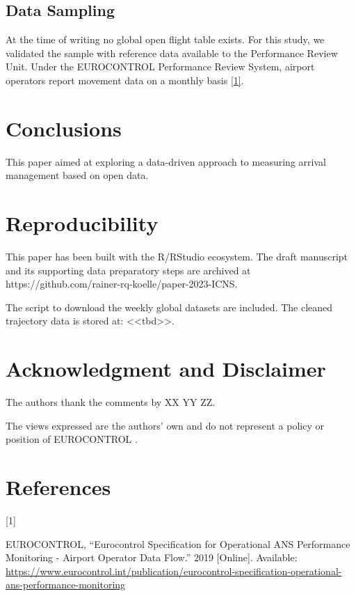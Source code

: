 \documentclass[letterpaper, 10 pt, journal, twoside]{IEEEtran}
\newlength{\cslhangindent}
\newlength{\csllabelwidth}
\newlength{\cslentryspacingunit} %
\newenvironment{CSLReferences}[2] %
 {%
  \setlength{\parindent}{0pt}
  \ifodd #1
  \let\oldpar\par
  \def\par{\hangindent=\cslhangindent\oldpar}
  \fi
  \setlength{\parskip}{#2\cslentryspacingunit}
 }%
 {}
\newcommand{\CSLLeftMargin}[1]{\parbox[t]{\csllabelwidth}{#1}}
\newcommand{\CSLRightInline}[1]{\parbox[t]{\linewidth - \csllabelwidth}{#1}\break}
\begin{document}
\hypertarget{data-sampling}{%
\subsection{Data Sampling}\label{data-sampling}}

At the time of writing no global open flight table exists. For this
study, we validated the sample with reference data available to the
Performance Review Unit. Under the EUROCONTROL Performance Review
System, airport operators report movement data on a monthly basis
\protect\hyperlink{ref-apdf_v1_2019}{{[}1{]}}.

\hypertarget{conclusions}{%
\section{Conclusions}\label{conclusions}}

This paper aimed at exploring a data-driven approach to measuring
arrival management based on open data.

\hypertarget{reproducibility}{%
\section*{Reproducibility}\label{reproducibility}}

This paper has been built with the R/RStudio ecosystem. The draft
manuscript and its supporting data preparatory steps are archived at
https://github.com/rainer-rq-koelle/paper-2023-ICNS.

The script to download the weekly global datasets are included. The
cleaned trajectory data is stored at:
\textless\textless tbd\textgreater\textgreater.

\hypertarget{acknowledgment-and-disclaimer}{%
\section{Acknowledgment and
Disclaimer}\label{acknowledgment-and-disclaimer}}

The authors thank the comments by XX YY ZZ.

The views expressed are the authors' own and do not represent a policy
or position of EUROCONTROL .

\hypertarget{bibliography}{%
\section*{References}\label{bibliography}}

\hypertarget{refs}{}
\begin{CSLReferences}{0}{0}
\leavevmode{}%
\CSLLeftMargin{{[}1{]} }%
\CSLRightInline{EUROCONTROL, {``Eurocontrol {Specification} for
{Operational ANS Performance Monitoring} - {Airport Operator Data
Flow}.''} 2019 {[}Online{]}. Available:
\url{https://www.eurocontrol.int/publication/eurocontrol-specification-operational-ans-performance-monitoring}}

\end{CSLReferences}

\end{document}
